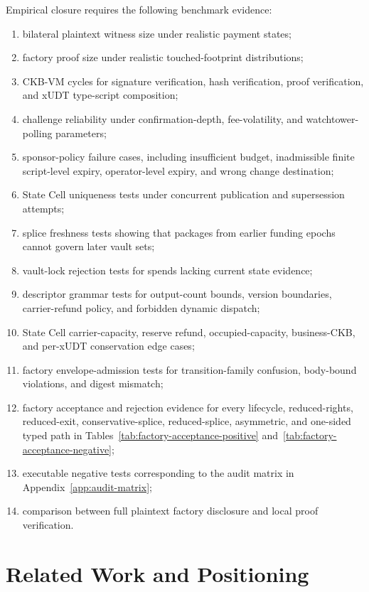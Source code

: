 \documentclass[a4paper,11pt]{article}
\begin{document}
Empirical closure requires the following benchmark evidence:
\begin{enumerate}[label=E\arabic*.]
  \item bilateral plaintext witness size under realistic payment states;
  \item factory proof size under realistic touched-footprint distributions;
  \item CKB-VM cycles for signature verification, hash verification, proof verification, and xUDT type-script composition;
  \item challenge reliability under confirmation-depth, fee-volatility, and watchtower-polling parameters;
  \item sponsor-policy failure cases, including insufficient budget, inadmissible finite script-level expiry, operator-level expiry, and wrong change destination;
  \item State Cell uniqueness tests under concurrent publication and supersession attempts;
  \item splice freshness tests showing that packages from earlier funding epochs cannot govern later vault sets;
  \item vault-lock rejection tests for spends lacking current state evidence;
  \item descriptor grammar tests for output-count bounds, version boundaries, carrier-refund policy, and forbidden dynamic dispatch;
  \item State Cell carrier-capacity, reserve refund, occupied-capacity, business-CKB, and per-xUDT conservation edge cases;
  \item factory envelope-admission tests for transition-family confusion, body-bound violations, and digest mismatch;
  \item factory acceptance and rejection evidence for every lifecycle, reduced-rights, reduced-exit, conservative-splice, reduced-splice, asymmetric, and one-sided typed path in Tables~\ref{tab:factory-acceptance-positive} and~\ref{tab:factory-acceptance-negative};
  \item executable negative tests corresponding to the audit matrix in Appendix~\ref{app:audit-matrix};
  \item comparison between full plaintext factory disclosure and local proof verification.
\end{enumerate}

\clearpage
\section{Related Work and Positioning}
\end{document}
